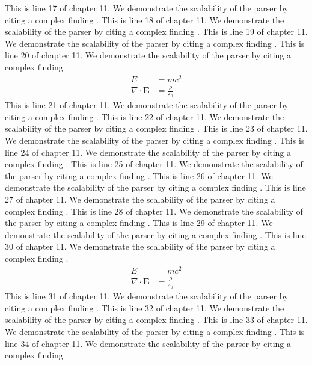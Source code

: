 This is line 17 of chapter 11. We demonstrate the scalability of the parser by citing a complex finding \cite{ref11_17}.
This is line 18 of chapter 11. We demonstrate the scalability of the parser by citing a complex finding \cite{ref11_18}.
This is line 19 of chapter 11. We demonstrate the scalability of the parser by citing a complex finding \cite{ref11_19}.
This is line 20 of chapter 11. We demonstrate the scalability of the parser by citing a complex finding \cite{ref11_20}.
\begin{align*}
  E &= mc^2 \\
  \nabla \cdot \mathbf{E} &= \frac{\rho}{\varepsilon_0}
\end{align*}
This is line 21 of chapter 11. We demonstrate the scalability of the parser by citing a complex finding \cite{ref11_21}.
This is line 22 of chapter 11. We demonstrate the scalability of the parser by citing a complex finding \cite{ref11_22}.
This is line 23 of chapter 11. We demonstrate the scalability of the parser by citing a complex finding \cite{ref11_23}.
This is line 24 of chapter 11. We demonstrate the scalability of the parser by citing a complex finding \cite{ref11_24}.
This is line 25 of chapter 11. We demonstrate the scalability of the parser by citing a complex finding \cite{ref11_25}.
This is line 26 of chapter 11. We demonstrate the scalability of the parser by citing a complex finding \cite{ref11_26}.
This is line 27 of chapter 11. We demonstrate the scalability of the parser by citing a complex finding \cite{ref11_27}.
This is line 28 of chapter 11. We demonstrate the scalability of the parser by citing a complex finding \cite{ref11_28}.
This is line 29 of chapter 11. We demonstrate the scalability of the parser by citing a complex finding \cite{ref11_29}.
This is line 30 of chapter 11. We demonstrate the scalability of the parser by citing a complex finding \cite{ref11_30}.
\begin{align*}
  E &= mc^2 \\
  \nabla \cdot \mathbf{E} &= \frac{\rho}{\varepsilon_0}
\end{align*}
This is line 31 of chapter 11. We demonstrate the scalability of the parser by citing a complex finding \cite{ref11_31}.
This is line 32 of chapter 11. We demonstrate the scalability of the parser by citing a complex finding \cite{ref11_32}.
This is line 33 of chapter 11. We demonstrate the scalability of the parser by citing a complex finding \cite{ref11_33}.
This is line 34 of chapter 11. We demonstrate the scalability of the parser by citing a complex finding \cite{ref11_34}.
